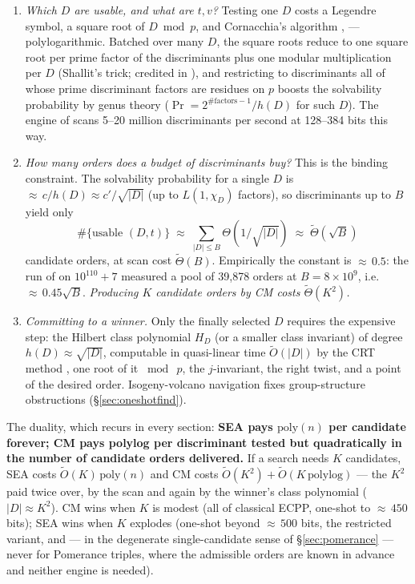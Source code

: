 \documentclass[11pt]{amsart}
\newcommand{\Ot}{\widetilde{O}}
\newcommand{\Tt}{\widetilde{\Theta}}
\newcommand{\osf}{\cite{OSF}}
\theoremstyle{plain}
\theoremstyle{definition}
\theoremstyle{remark}
\begin{document}
\begin{enumerate}
\item \emph{Which $D$ are usable, and what are $t, v$?}  Testing one $D$ costs a Legendre symbol, a
square root of $D \bmod p$, and Cornacchia's algorithm \cite{Cor08}, \cite[\S2.3.4]{CP05} ---
polylogarithmic.  Batched over many $D$, the square roots reduce to one square root per prime factor of
the discriminants plus one modular multiplication per $D$ (Shallit's trick; credited in
\cite{Mor07,FKMW04}), and restricting to discriminants all of whose prime discriminant factors are
residues on $p$ boosts the solvability probability by genus theory
($\Pr = 2^{\#\text{factors}-1}/h(D)$ for such $D$).  The engine of \osf{} scans 5--20 million
discriminants per second at 128--384 bits this way.
\item \emph{How many orders does a budget of discriminants buy?}  This is the binding constraint.  The
solvability probability for a single $D$ is ${\approx}\,c/h(D) \approx c'/\sqrt{|D|}$ (up to
$L(1, \chi_D)$ factors), so discriminants up to $B$ yield only
\[
  \#\{\text{usable } (D, t)\} \;\approx\; \sum_{|D|\le B} \Theta(1/\sqrt{|D|}) \;\approx\; \Tt(\sqrt B)
\]
candidate orders, at scan cost $\Tt(B)$.  Empirically the constant is ${\approx}\,0.5$: the run of
\osf{} on $10^{110}+7$ measured a pool of 39{,}878 orders at
$B = 8\times 10^9$, i.e.\ ${\approx}\,0.45\sqrt B$.  \emph{Producing $K$ candidate orders by CM costs
$\Tt(K^2)$.}
\item \emph{Committing to a winner.}  Only the finally selected $D$ requires the expensive step: the
Hilbert class polynomial $H_D$ (or a smaller class invariant) of degree $h(D) \approx \sqrt{|D|}$,
computable in quasi-linear time $\Ot(|D|)$ by the CRT method \cite{Suth11,Enge09,Suth12}, one root of it
$\bmod\ p$, the $j$-invariant, the right twist, and a point of the desired order.  Isogeny-volcano
navigation \cite{Kohel96,FM02,Suth13} fixes group-structure obstructions (\S\ref{sec:oneshotfind}).
\end{enumerate}

The duality, which recurs in every section: \textbf{SEA pays $\mathrm{poly}(n)$ per candidate forever;
CM pays polylog per discriminant tested but quadratically in the number of candidate orders
delivered.}  If a search needs $K$
candidates, SEA costs $\Ot(K)\,\mathrm{poly}(n)$ and CM costs $\Ot(K^2) + \Ot(K\,\mathrm{polylog})$
--- the $K^2$ paid twice over, by the scan and again by the winner's class polynomial
($|D| \approx K^2$).
CM wins when $K$ is modest (all of classical ECPP, one-shot to ${\approx}\,450$ bits); SEA wins when $K$
explodes (one-shot beyond ${\approx}\,500$ bits, the restricted variant, and --- in the degenerate
single-candidate sense of \S\ref{sec:pomerance} --- never for Pomerance triples, where the admissible
orders are known in advance and neither engine is needed).
\end{document}
